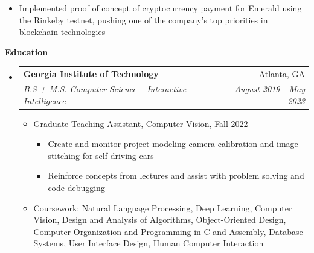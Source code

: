 \documentclass[letterpaper,11pt]{article}
\makeatletter
\newcommand{\resitem}[1]{\item #1 \vspace{-2pt}}
\newcommand{\resheading}[1]{{\large \colorbox{mygrey}{\begin{minipage}{\textwidth}{\textbf{#1 \vphantom{p\^{E}}}}\end{minipage}}}}
\newcommand{\ressubheading}[4]{
\begin{tabular*}{7.0in}{l@{\extracolsep{\fill}}r}
		\textbf{#1} & #2 \\
		\textit{#3} & \textit{#4} \\
\end{tabular*}\vspace{-6pt}}
\makeatother
\begin{document}
\begin{itemize}
\begin{itemize}
        \resitem{Implemented proof of concept of cryptocurrency payment for Emerald using the Rinkeby testnet, pushing one of the company's top priorities in blockchain technologies}
    \end{itemize}
\end{itemize}



\resheading{Education}
\begin{itemize}\item[]
    \ressubheading{Georgia Institute of Technology}{Atlanta, GA}{B.S + M.S. Computer Science -- Interactive Intelligence}{August 2019 - May 2023}
        \begin{itemize}
            \resitem{Graduate Teaching Assistant, Computer Vision, Fall 2022}
            \begin{itemize}
                \resitem{Create and monitor project modeling camera calibration and image stitching for self-driving cars}
                \resitem{Reinforce concepts from lectures and assist with problem solving and code debugging}
            \end{itemize}
            \resitem{Coursework: Natural Language Processing, Deep Learning, Computer Vision, Design and Analysis of Algorithms, Object-Oriented Design, Computer Organization and Programming in C and Assembly, Database Systems, User Interface Design, Human Computer Interaction}
	\end{itemize}
\end{itemize}
\end{document}
